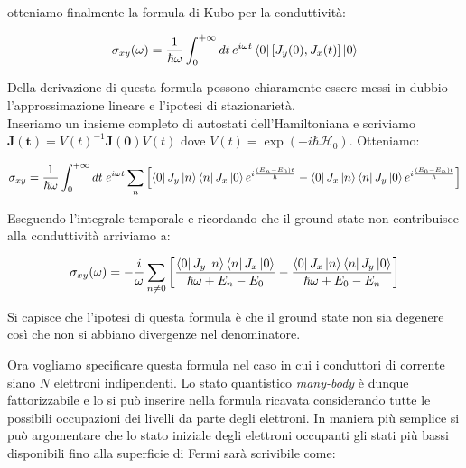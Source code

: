 \documentclass[12pt,a4paper]{article}
\begin{document}
otteniamo finalmente la formula di Kubo per la conduttività:

\begin{equation}
\sigma_{xy} (\omega) = \frac{1}{\hbar \omega} \int_{0}^{+\infty} dt \, e^{i \omega t} \bra{0}\left[ J_{y} (0), J_{x}(t) \right] \ket{0}
\end{equation}

Della derivazione di questa formula possono chiaramente essere messi in dubbio l'approssimazione lineare e l'ipotesi di stazionarietà.\\

Inseriamo un insieme completo di autostati dell'Hamiltoniana e scriviamo $\mathbf{J(t)} = V(t)^{-1} \mathbf{J(0)} V(t)$ dove $V(t) = \exp \left( - i \hbar \mathcal{H}_{0} \right)$. Otteniamo:

\begin{equation}
\sigma_{xy} = \frac{1}{\hbar \omega} \int_{0}^{+\infty} dt \; e^{i \omega t} \sum_{n} \left[ \bra{0} J_{y} \ket{n} \bra{n} J_{x} \ket{0} e^{i \frac{(E_n - E_0)t}{\hbar}} -
\bra{0} J_{x} \ket{n} \bra{n} J_{y} \ket{0} e^{i \frac{(E_0 - E_n)t}{\hbar}} \right]
\end{equation}


Eseguendo l'integrale temporale e ricordando che il ground state non contribuisce alla conduttività arriviamo a:

\begin{equation}
\sigma_{xy} (\omega) = - \frac{i}{\omega} \sum_{n \neq 0} \left[ \frac{\bra{0} J_{y} \ket{n} \bra{n} J_{x} \ket{0}}{\hbar \omega + E_n - E_0} - \frac{\bra{0} J_{x} \ket{n} \bra{n} J_{y} \ket{0}}{\hbar \omega + E_0 - E_n} \right]
\end{equation}

Si capisce che l'ipotesi di questa formula è che il ground state non sia degenere così che non si abbiano divergenze nel denominatore.

Ora vogliamo specificare questa formula nel caso in cui i conduttori di corrente siano $N$ elettroni indipendenti. Lo stato quantistico \emph{many-body} è dunque fattorizzabile e lo si può inserire nella formula ricavata considerando tutte le possibili occupazioni dei livelli da parte degli elettroni. 
In maniera più semplice si può argomentare che lo stato iniziale degli elettroni occupanti gli stati più bassi disponibili fino alla superficie di Fermi sarà scrivibile come:
\end{document}
